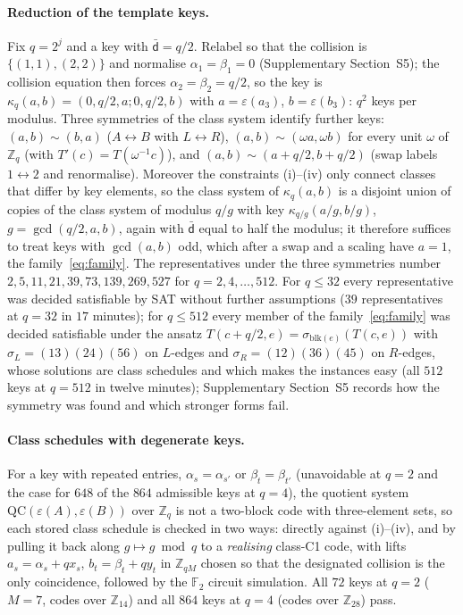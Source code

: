 \documentclass[reprint,twocolumn,superscriptaddress,nofootinbib]{revtex4-2}
\theoremstyle{plain}
\newcommand{\Zq}{\mathbb{Z}_q}
\newcommand{\F}{\mathbb{F}_2}
\newcommand{\colbar}{\bar{\mathsf{d}}} %
\begin{document}
\paragraph*{Reduction of the template keys.}
Fix $q=2^j$ and a key with $\colbar=q/2$. Relabel so that the collision is
$\{(1,1),(2,2)\}$ and normalise $\alpha_1=\beta_1=0$ (Supplementary
Section~S5); the collision equation then forces $\alpha_2=\beta_2=q/2$, so
the key is $\kappa_q(a,b)=(0,q/2,a;0,q/2,b)$ with $a=\varepsilon(a_3)$,
$b=\varepsilon(b_3)$: $q^2$ keys per modulus. Three symmetries of the class
system identify further keys: $(a,b)\sim(b,a)$ ($A\leftrightarrow B$ with
$L\leftrightarrow R$), $(a,b)\sim(\omega a,\omega b)$ for every unit
$\omega$ of $\Zq$ (with $T'(c)=T(\omega^{-1}c)$), and
$(a,b)\sim(a+q/2,b+q/2)$ (swap labels $1\leftrightarrow2$ and
renormalise). Moreover the constraints (i)--(iv) only connect classes that
differ by key elements, so the class system of $\kappa_q(a,b)$ is a
disjoint union of copies of the class system of modulus $q/g$ with key
$\kappa_{q/g}(a/g,b/g)$, $g=\gcd(q/2,a,b)$, again with $\colbar$ equal to
half the modulus; it therefore suffices to treat keys with $\gcd(a,b)$
odd, which after a swap and a scaling have $a=1$, the
family~\eqref{eq:family}. The representatives under the three symmetries
number $2,5,11,21,39,73,139,269,527$ for $q=2,4,\dots,512$. For $q\le32$
every representative was decided satisfiable by SAT without further
assumptions ($39$ representatives at $q=32$ in $17$ minutes); for
$q\le512$ every
member of the family~\eqref{eq:family} was decided satisfiable under the
ansatz $T(c+q/2,e)=\sigma_{\mathrm{blk}(e)}(T(c,e))$ with
$\sigma_L=(13)(24)(56)$ on $L$-edges and $\sigma_R=(12)(36)(45)$ on
$R$-edges, whose solutions are class schedules and which makes the
instances easy (all $512$ keys at $q=512$ in twelve minutes); Supplementary
Section~S5 records how the symmetry was found and which stronger forms
fail.

\paragraph*{Class schedules with degenerate keys.}
For a key with repeated entries, $\alpha_s=\alpha_{s'}$ or
$\beta_t=\beta_{t'}$ (unavoidable at $q=2$ and the case for $648$ of the
$864$ admissible keys at $q=4$), the quotient system $\mathrm{QC}(\varepsilon(A),
\varepsilon(B))$ over $\Zq$ is not a two-block code with three-element
sets, so each stored class schedule is checked in two ways: directly
against (i)--(iv), and by pulling it back along $g\mapsto g\bmod q$ to a
\emph{realising} class-C1 code, with lifts $a_s=\alpha_s+qx_s$,
$b_t=\beta_t+qy_t$ in $\mathbb{Z}_{qM}$ chosen so that the designated
collision is the only coincidence, followed by the $\F$ circuit
simulation. All $72$ keys at $q=2$ ($M=7$, codes over $\mathbb{Z}_{14}$)
and all $864$ keys at $q=4$ (codes over $\mathbb{Z}_{28}$) pass.
\end{document}
